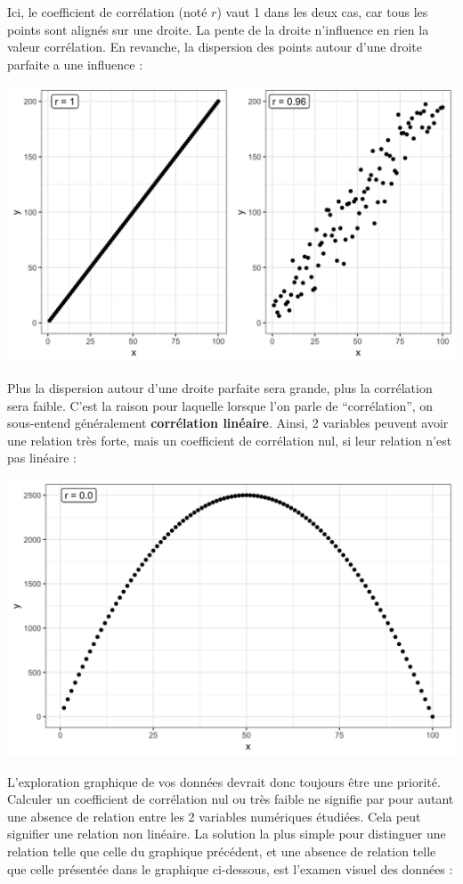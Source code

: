\documentclass[a4paperpaper,]{article}
\begin{document}
Ici, le coefficient de corrélation (noté \(r\)) vaut 1 dans les deux cas, car tous les points sont alignés sur une droite. La pente de la droite n'influence en rien la valeur corrélation. En revanche, la dispersion des points autour d'une droite parfaite a une influence :

\begin{center}\includegraphics[width=0.9\linewidth]{figure/unnamed-chunk-96-1} \end{center}

Plus la dispersion autour d'une droite parfaite sera grande, plus la corrélation sera faible. C'est la raison pour laquelle lorsque l'on parle de ``corrélation'', on sous-entend généralement \textbf{corrélation linéaire}. Ainsi, 2 variables peuvent avoir une relation très forte, mais un coefficient de corrélation nul, si leur relation n'est pas linéaire :

\begin{center}\includegraphics[width=0.9\linewidth]{figure/unnamed-chunk-97-1} \end{center}

L'exploration graphique de vos données devrait donc toujours être une priorité. Calculer un coefficient de corrélation nul ou très faible ne signifie par pour autant une absence de relation entre les 2 variables numériques étudiées. Cela peut signifier une relation non linéaire. La solution la plus simple pour distinguer une relation telle que celle du graphique précédent, et une absence de relation telle que celle présentée dans le graphique ci-dessous, est l'examen visuel des données :
\end{document}
